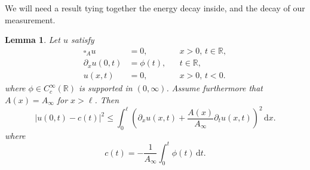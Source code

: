 \documentclass[10pt,a4paper]{article}
\theoremstyle{plain}
\newtheorem{lemma}[theorem]{Lemma}
\theoremstyle{definition}
\theoremstyle{remark}
\numberwithin{equation}{section}
\newcommand{\R}{\mathbb{R}}
\newcommand{\dt}{\,\mathrm{d}t}
\newcommand{\dx}{\,\mathrm{d}x}
\begin{document}
\bigskip We will need a result tying together the energy decay inside, and the decay of our measurement.
\begin{lemma}
  \label{lem:measurement-decay}
  Let $u$ satisfy 
  \begin{align}
    \square_A u &= 0, && x>0,\, t\in\R,\\
    \partial_x u (0,t) &= \phi(t), && t\in\R,\\
    u(x,t) &= 0, && x>0,\, t<0.
  \end{align}
  where $\phi \in C^{\infty}_c (\R)$ is supported in $(0,\infty)$. Assume furthermore that $A(x)=A_\infty$ for $x > \ell$. Then
  \begin{equation}
    \big|  u(0,t) -c(t)  \big|^2 \leq \int_0^{\ell} \left(   \partial_x u (x,t) + \frac{A(x)}{A_\infty} \partial_t u(x,t) \right)^2  \dx.  
  \end{equation}
  where
  \begin{equation}
    c(t) = - \frac{1}{A_\infty} \int_0^t \phi (t) \dt.
  \end{equation}
\end{lemma}
\end{document}
